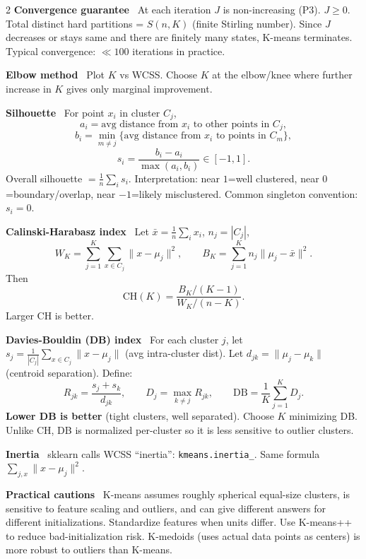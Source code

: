 \documentclass[10pt,fleqn]{article}
\newcommand{\topic}[1]{\textbf{#1}\ }
\begin{document}
\begin{multicols*}{2}
\topic{Convergence guarantee} At each iteration \(J\) is non-increasing (P3). \(J\ge 0\). Total distinct hard partitions = \(S(n,K)\) (finite Stirling number). Since \(J\) decreases or stays same and there are finitely many states, K-means terminates. Typical convergence: \(\ll 100\) iterations in practice.

\topic{Elbow method} Plot \(K\) vs WCSS. Choose \(K\) at the elbow/knee where further increase in \(K\) gives only marginal improvement.

\topic{Silhouette} For point \(x_i\) in cluster \(C_j\),
\[
a_i=\text{avg distance from }x_i\text{ to other points in }C_j,
\]
\[
b_i=\min_{m\neq j}\{\text{avg distance from }x_i\text{ to points in }C_m\},
\]
\[
s_i=\frac{b_i-a_i}{\max(a_i,b_i)}\in[-1,1].
\]
Overall silhouette \(=\frac1n\sum_i s_i\). Interpretation: near \(1\)=well clustered, near \(0\)=boundary/overlap, near \(-1\)=likely misclustered. Common singleton convention: \(s_i=0\).

\topic{Calinski-Harabasz index} Let \(\bar x=\frac1n\sum_i x_i\), \(n_j=|C_j|\),
\[
W_K=\sum_{j=1}^K\sum_{x\in C_j}\|x-\mu_j\|^2,\qquad
B_K=\sum_{j=1}^K n_j\|\mu_j-\bar x\|^2.
\]
Then
\[
\mathrm{CH}(K)=\frac{B_K/(K-1)}{W_K/(n-K)}.
\]
Larger CH is better.

\topic{Davies-Bouldin (DB) index} For each cluster \(j\), let \(s_j=\frac1{|C_j|}\sum_{x\in C_j}\|x-\mu_j\|\) (avg intra-cluster dist). Let \(d_{jk}=\|\mu_j-\mu_k\|\) (centroid separation). Define:
\[
R_{jk}=\frac{s_j+s_k}{d_{jk}},\qquad D_j=\max_{k\neq j}R_{jk},\qquad \mathrm{DB}=\frac1K\sum_{j=1}^K D_j.
\]
\textbf{Lower DB is better} (tight clusters, well separated). Choose \(K\) minimizing DB. Unlike CH, DB is normalized per-cluster so it is less sensitive to outlier clusters.

\topic{Inertia} sklearn calls WCSS ``inertia'': \texttt{kmeans.inertia\_}. Same formula \(\sum_{j,x}\|x-\mu_j\|^2\).

\topic{Practical cautions} K-means assumes roughly spherical equal-size clusters, is sensitive to feature scaling and outliers, and can give different answers for different initializations. Standardize features when units differ. Use K-means++ to reduce bad-initialization risk. K-medoids (uses actual data points as centers) is more robust to outliers than K-means.


\end{multicols*}
\end{document}
